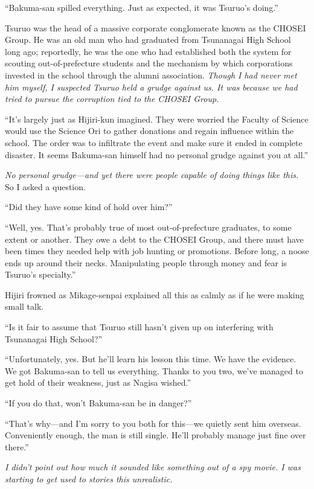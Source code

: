 \documentclass[
    a4paper,
    12pt,
    twoside,
    openany,
    UTF8,
    fontset=windows
]{ctexbook}
\begin{document}
``Bakuma-san spilled everything. Just as expected, it was Tsuruo's doing.''

Tsuruo was the head of a massive corporate conglomerate known as the CHOSEI Group. He was an old man who had graduated from Tsunanagai High School long ago; reportedly, he was the one who had established both the system for scouting out-of-prefecture students and the mechanism by which corporations invested in the school through the alumni association. \textit{Though I had never met him myself, I suspected Tsuruo held a grudge against us. It was because we had tried to pursue the corruption tied to the CHOSEI Group.}

``It's largely just as Hijiri-kun imagined. They were worried the Faculty of Science would use the Science Ori to gather donations and regain influence within the school. The order was to infiltrate the event and make sure it ended in complete disaster. It seems Bakuma-san himself had no personal grudge against you at all.''

\textit{No personal grudge---and yet there were people capable of doing things like this.} So I asked a question.

``Did they have some kind of hold over him?''

``Well, yes. That's probably true of most out-of-prefecture graduates, to some extent or another. They owe a debt to the CHOSEI Group, and there must have been times they needed help with job hunting or promotions. Before long, a noose ends up around their necks. Manipulating people through money and fear is Tsuruo's specialty.''

Hijiri frowned as Mikage-senpai explained all this as calmly as if he were making small talk.

``Is it fair to assume that Tsuruo still hasn't given up on interfering with Tsunanagai High School?''

``Unfortunately, yes. But he'll learn his lesson this time. We have the evidence. We got Bakuma-san to tell us everything. Thanks to you two, we've managed to get hold of their weakness, just as Nagisa wished.''

``If you do that, won't Bakuma-san be in danger?''

``That's why---and I'm sorry to you both for this---we quietly sent him overseas. Conveniently enough, the man is still single. He'll probably manage just fine over there.''

\textit{I didn't point out how much it sounded like something out of a spy movie. I was starting to get used to stories this unrealistic.}
\end{document}
